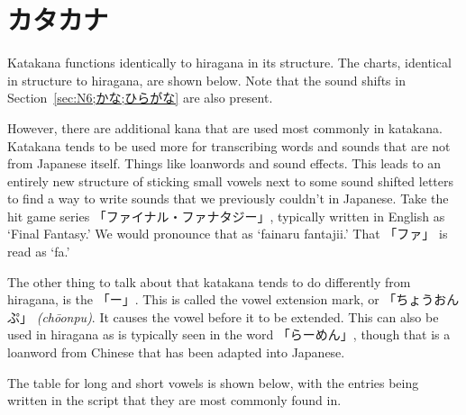 \section[カタカナ]{カタカナ}\label{sec:N6;かな;カタカナ}

Katakana functions identically to hiragana in its structure. The charts, identical in structure to hiragana, are shown below. Note that the sound shifts in Section~\ref{sec:N6;かな;ひらがな} are also present.





However, there are additional kana that are used most commonly in katakana. Katakana tends to be used more for transcribing words and sounds that are not from Japanese itself. Things like loanwords and sound effects. This leads to an entirely new structure of sticking small vowels next to some sound shifted letters to find a way to write sounds that we previously couldn't in Japanese. Take the hit game series 「ファイナル・ファナタジー」, typically written in English as `Final Fantasy.' We would pronounce that as `fainaru fantajii.' That 「ファ」 is read as `fa.'

The other thing to talk about that katakana tends to do differently from hiragana, is the 「ー」. This is called the vowel extension mark, or 「ちょうおんぷ」 \textit{(ch\=oonpu)}. It causes the vowel before it to be extended. This can also be used in hiragana as is typically seen in the word 「らーめん」, though that is a loanword from Chinese that has been adapted into Japanese.

The table for long and short vowels is shown below, with the entries being written in the script that they are most commonly found in.


